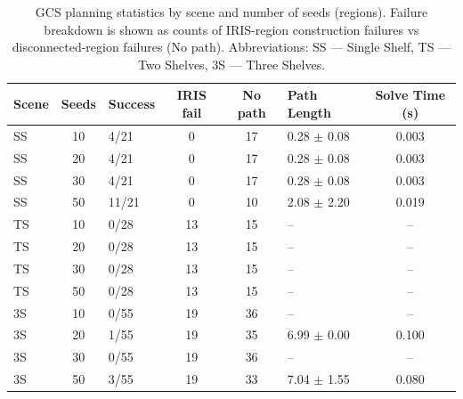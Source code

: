 \documentclass[a4paper]{article}
\begin{document}
\begin{table}[H]
\centering
\caption{GCS planning statistics by scene and number of seeds (regions). Failure breakdown is shown as counts of IRIS-region construction failures vs disconnected-region failures (No path). Abbreviations: SS --- Single Shelf, TS --- Two Shelves, 3S --- Three Shelves.}
\label{tab:success_results}
\begin{tabular}{l
                S[table-format=2.0]
                l
                S[table-format=2.0]
                S[table-format=2.0]
                l
                S[table-format=1.3]}
\toprule
\textbf{Scene} & \textbf{Seeds} & \textbf{Success} & \textbf{IRIS fail} & \textbf{No path} & \textbf{Path Length} & \textbf{Solve Time (s)} \\
\midrule
SS & 10 & 4/21  & 0  & 17 & 0.28 $\pm$ 0.08 & 0.003 \\
SS & 20 & 4/21  & 0  & 17 & 0.28 $\pm$ 0.08 & 0.003 \\
SS & 30 & 4/21  & 0  & 17 & 0.28 $\pm$ 0.08 & 0.003 \\
SS & 50 & 11/21 & 0  & 10 & 2.08 $\pm$ 2.20 & 0.019 \\
\addlinespace
TS & 10 & 0/28 & 13 & 15 & -- &  \\
TS & 20 & 0/28 & 13 & 15 & -- &  \\
TS & 30 & 0/28 & 13 & 15 & -- &  \\
TS & 50 & 0/28 & 13 & 15 & -- &  \\
\addlinespace
3S & 10 & 0/55 & 19 & 36 & -- &  \\
3S & 20 & 1/55 & 19 & 35 & 6.99 $\pm$ 0.00 & 0.100 \\
3S & 30 & 0/55 & 19 & 36 & -- &  \\
3S & 50 & 3/55 & 19 & 33 & 7.04 $\pm$ 1.55 & 0.080 \\
\bottomrule
\end{tabular}
\end{table}
\end{document}
